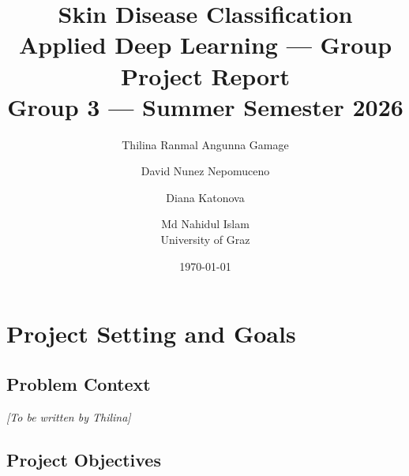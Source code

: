 \documentclass[11pt,a4paper]{article}
\title{%
  \textbf{Skin Disease Classification}\\[0.5em]
  \large Applied Deep Learning --- Group Project Report\\[0.3em]
  \normalsize Group 3 --- Summer Semester 2026
}
\author{%
  Thilina Ranmal Angunna Gamage \and
  David Nunez Nepomuceno \and
  Diana Katonova \and
  Md Nahidul Islam\\[0.5em]
  \normalsize University of Graz
}
\date{\today}
\begin{document}
\maketitle
\tableofcontents
\newpage

\section{Project Setting and Goals}
\label{sec:setting}


\subsection{Problem Context}
%

\textit{[To be written by Thilina]}

\subsection{Project Objectives}
\end{document}
